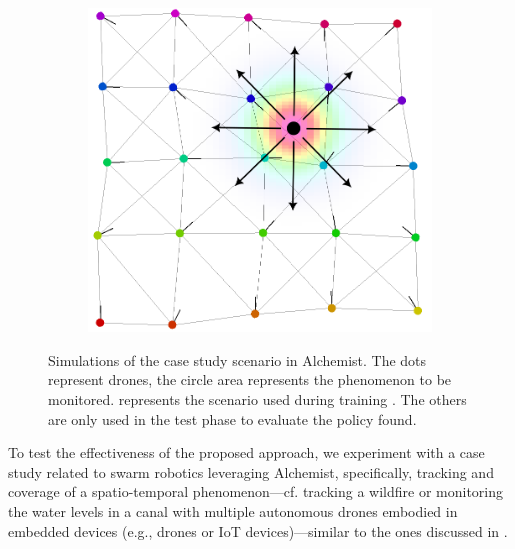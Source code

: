 \begin{figure}
\begin{subfigure}[b]{0.32\linewidth}
      \caption{}
      \label{acsos2023:fig:two}
  \end{subfigure}
  \begin{subfigure}[b]{0.32\linewidth}
      \includegraphics[width=\textwidth]{papers/acsos2023/imgs/example-moving.png}
      \caption{}
      \label{acsos2023:fig:moving}
  \end{subfigure}

 
  \caption[Simulations of the case study scenario in Alchemist for \ac{FIRL}.]{ Simulations of the case study scenario in Alchemist. 
  The dots represent drones, 
  the circle area represents the phenomenon to be monitored.
   represents the scenario used during training . 
  The others  are only used in the test phase to evaluate the policy found. }
  \label{acsos2023:fig:scenarios}
\end{figure}
To test the effectiveness of the proposed approach, 
 we experiment with a case study related to swarm robotics leveraging Alchemist, 
 specifically, tracking and coverage of a spatio-temporal phenomenon---cf. tracking a wildfire 
 or monitoring the water levels in a canal with multiple autonomous drones embodied in embedded devices (e.g., drones or IoT devices)---similar to the ones discussed in . 
